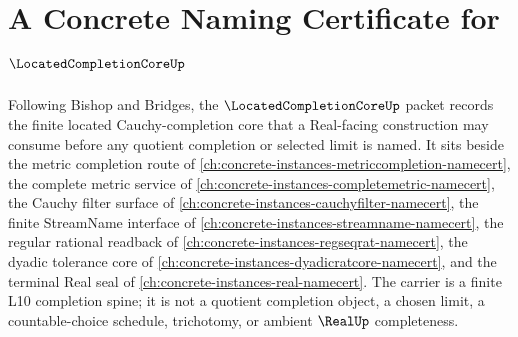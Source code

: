 \chapter{A Concrete Naming Certificate for $\LocatedCompletionCoreUp$}
\label{ch:concrete-instances-located-completion-core-namecert}

Following Bishop and Bridges, the $\LocatedCompletionCoreUp$ packet records the finite located Cauchy-completion core that a Real-facing construction may consume before any quotient completion or selected limit is named. It sits beside the metric completion route of \autoref{ch:concrete-instances-metriccompletion-namecert}, the complete metric service of \autoref{ch:concrete-instances-completemetric-namecert}, the Cauchy filter surface of \autoref{ch:concrete-instances-cauchyfilter-namecert}, the finite StreamName interface of \autoref{ch:concrete-instances-streamname-namecert}, the regular rational readback of \autoref{ch:concrete-instances-regseqrat-namecert}, the dyadic tolerance core of \autoref{ch:concrete-instances-dyadicratcore-namecert}, and the terminal Real seal of \autoref{ch:concrete-instances-real-namecert}. The carrier is a finite L10 completion spine; it is not a quotient completion object, a chosen limit, a countable-choice schedule, trichotomy, or ambient $\RealUp$ completeness.

